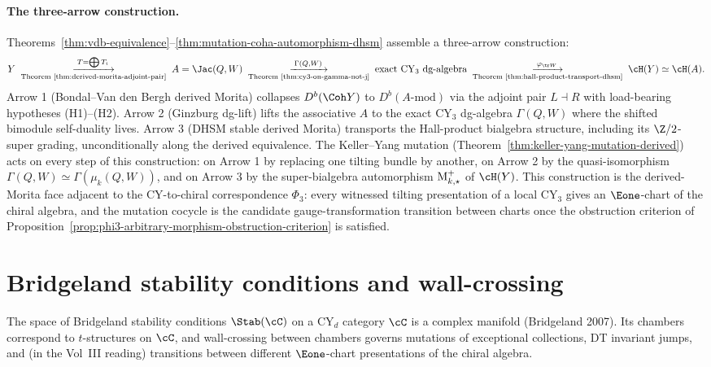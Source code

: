 \paragraph{The three-arrow construction.} Theorems~\ref{thm:vdb-equivalence}--\ref{thm:mutation-coha-automorphism-dhsm} assemble a three-arrow construction:
\[
 Y \;\underset{\text{Theorem~\ref{thm:derived-morita-adjoint-pair}}}{\xrightarrow{\;T = \bigoplus T_i\;}}\;
 A = \Jac(Q, W)
 \;\underset{\text{Theorem~\ref{thm:cy3-on-gamma-not-j}}}{\xrightarrow{\;\Gamma(Q, W)\;}}\;
 \text{exact CY}_3 \text{ dg-algebra}
 \;\underset{\text{Theorem~\ref{thm:hall-product-transport-dhsm}}}{\xrightarrow{\;\varphi_{\tr W}\;}}\;
 \cH(Y) \simeq \cH(A).
\]
Arrow 1 (Bondal--Van den Bergh derived Morita) collapses $D^{b}(\Coh Y)$ to $D^{b}(A\text{-}\mathrm{mod})$ via the adjoint pair $L \dashv R$ with load-bearing hypotheses (H1)--(H2). Arrow 2 (Ginzburg dg-lift) lifts the associative $A$ to the exact CY$_3$ dg-algebra $\Gamma(Q, W)$ where the shifted bimodule self-duality lives. Arrow 3 (DHSM stable derived Morita) transports the Hall-product bialgebra structure, including its $\Z/2$-super grading, unconditionally along the derived equivalence. The Keller--Yang mutation (Theorem~\ref{thm:keller-yang-mutation-derived}) acts on every step of this construction: on Arrow 1 by replacing one tilting bundle by another, on Arrow 2 by the quasi-isomorphism $\Gamma(Q, W) \simeq \Gamma(\mu_k(Q, W))$, and on Arrow 3 by the super-bialgebra automorphism $\mathrm{M}_{k, \star}^{+}$ of $\cH(Y)$. This construction is the derived-Morita face adjacent to the CY-to-chiral correspondence $\Phi_3$: every witnessed tilting presentation of a local CY$_3$ gives an $\Eone$-chart of the chiral algebra, and the mutation cocycle is the candidate gauge-transformation transition between charts once the obstruction criterion of Proposition~\ref{prop:phi3-arbitrary-morphism-obstruction-criterion} is satisfied.

\section{Bridgeland stability conditions and wall-crossing}
\label{sec:bridgeland-stab}

The space of Bridgeland stability conditions $\Stab(\cC)$ on a CY$_d$ category $\cC$ is a complex manifold (Bridgeland 2007). Its chambers correspond to $t$-structures on $\cC$, and wall-crossing between chambers governs mutations of exceptional collections, DT invariant jumps, and (in the Vol~III reading) transitions between different $\Eone$-chart presentations of the chiral algebra.


